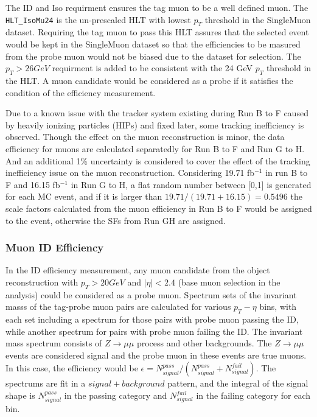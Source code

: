 The ID and Iso requirment ensures the tag muon to be a well defined muon. The \texttt{HLT_IsoMu24} is the un-prescaled HLT with lowest $p_T$ threshold in the SingleMuon dataset. Requiring the tag muon to pass this HLT assures that the selected event would be kept in the SingleMuon dataset so that the efficiencies to be masured from the probe muon would not be biased due to the dataset for selection. The $p_T > 26 GeV$ requirment is added to be consistent with the 24 GeV $p_T$ threshold in the HLT. A muon candidate would be considered as a probe if it satisfies the condition of the efficiency measurement. 

\vspace{0.3cm}
Due to a known issue with the tracker system existing during Run B to F caused by heavily ionizing particles (HIPs) and fixed later, some tracking inefficiency is observed. Though the effect on the muon reconstruction is minor, the data efficiency for muons are calculated separatedly for Run B to F and Run G to H. And an additional 1\% uncertainty is considered to cover the effect of the tracking inefficiency issue on the muon reconstruction. Considering 19.71 fb$^{-1}$ in run B to F and 16.15 fb$^{-1}$ in Run G to H, a flat random number between [0,1] is generated for each MC event, and if it is larger than $19.71/(19.71+16.15)=0.5496$ the scale factors calculated from the muon efficiency in Run B to F would be assigned to the event, otherwise the SFs from Run GH are assigned.

\subsubsection{Muon ID Efficiency}
In the ID efficiency measurement, any muon candidate from the object reconstruction with $p_T > 20GeV$ and $|\eta|<2.4$ (base muon selection in the analysis) could be considered as a probe muon. Spectrum sets of the invariant masss of the tag-probe muon pairs are calculated for various $p_T - \eta$ bins, with each set including a spectrum for those pairs with probe muon passing the ID, while another spectrum for pairs with probe muon failing the ID. The invariant mass spectrum consists of $Z\rightarrow \mu\mu$ process and other backgrounds. The $Z\rightarrow \mu\mu$ events are considered signal and the probe muon in these events are true muons. In this case, the efficiency would be $\epsilon=N_{signal}^{pass}/(N_{signal}^{pass}+N_{signal}^{fail})$. The spectrums are fit in a $signal+background$ pattern, and the integral of the signal shape is $N_{signal}^{pass}$ in the passing category and $N_{signal}^{fail}$ in the failing category for each bin. 


